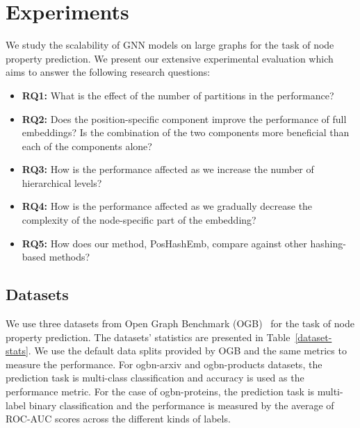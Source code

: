 \documentclass[conference]{IEEEtran}
\begin{document}
\section{Experiments}
\label{experiments}
We study the scalability of GNN models on large graphs for the task of node property prediction. We present our extensive experimental evaluation which aims to answer the following research questions:
\begin{itemize}
    \item \textbf{RQ1:} What is the effect of the number of partitions in the performance?
    \item \textbf{RQ2:} Does the position-specific component improve the performance of full embeddings? Is the combination of the two components more beneficial than each of the components alone?
    \item \textbf{RQ3:} How is the performance affected as we increase the number of hierarchical levels?
    \item \textbf{RQ4:} How is the performance affected as we gradually decrease the complexity of the node-specific part of the embedding? 
    \item \textbf{RQ5:} How does our method, PosHashEmb, compare against other hashing-based methods? 
\end{itemize}

\subsection{Datasets}
We use three datasets from Open Graph Benchmark (OGB)~\cite{hu2020open} for the task of node property prediction. The datasets' statistics are presented in Table~\ref{dataset-stats}. We use the default data splits provided by OGB and the same metrics to measure the performance. For ogbn-arxiv and ogbn-products datasets, the prediction task is multi-class classification and accuracy is used as the performance metric.
For the case of ogbn-proteins, the prediction task is multi-label binary classification and the performance is measured by the average of ROC-AUC scores across the different kinds of labels.
\end{document}

